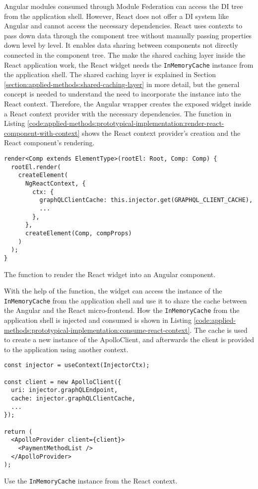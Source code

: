 \noindent Angular modules consumed through Module Federation can access the \ac{DI} tree from the application shell. However, React does not offer a \ac{DI} system like Angular and cannot access the necessary dependencies. React uses contexts to pass down data through the component tree without manually passing properties down level by level. It enables data sharing between components not directly connected in the component tree. The make the shared caching layer inside the React application work, the React widget needs the \texttt{InMemoryCache} instance from the application shell. The shared caching layer is explained in Section \ref{section:applied-methods:shared-caching-layer} in more detail, but the general concept is needed to understand the need to incorporate the instance into the React context. Therefore, the Angular wrapper creates the exposed widget inside a React context provider with the necessary dependencies. The function in Listing \ref{code:applied-methods:prototypical-implementation:render-react-component-with-context} shows the React context provider's creation and the React component's rendering. 

\ifshowListings
\begin{listing}[H]
    \begin{verbatim}
render<Comp extends ElementType>(rootEl: Root, Comp: Comp) {
  rootEl.render(
    createElement(
      NgReactContext, {
        ctx: {
          graphQLClientCache: this.injector.get(GRAPHQL_CLIENT_CACHE),
          ...
        },
      },
      createElement(Comp, compProps)
    )
  );
}
    \end{verbatim}
    \caption{The function to render the React widget into an Angular component.}\label{code:applied-methods:prototypical-implementation:render-react-component-with-context}
\end{listing}
\fi

\noindent With the help of the function, the widget can access the instance of the \texttt{InMemoryCache} from the application shell and use it to share the cache between the Angular and the React micro-frontend. How the \texttt{InMemoryCache} from the application shell is injected and consumed is shown in Listing \ref{code:applied-methods:prototypical-implementation:consume-react-context}. The cache is used to create a new instance of the ApolloClient, and afterwards the client is provided to the application using another context.

\ifshowListings
\begin{listing}[H]
    \begin{verbatim}
const injector = useContext(InjectorCtx);

const client = new ApolloClient({
  uri: injector.graphQLEndpoint,
  cache: injector.graphQLClientCache,
  ...
});

return (
  <ApolloProvider client={client}>
    <PaymentMethodList />
  </ApolloProvider>
);

    \end{verbatim}
    \caption{Use the \texttt{InMemoryCache} instance from the React context.}\label{code:applied-methods:prototypical-implementation:consume-react-context}
\end{listing}
\fi

